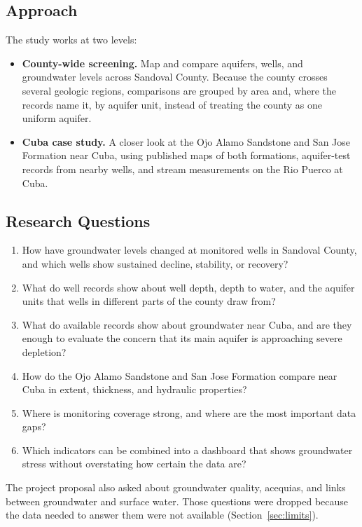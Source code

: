 \documentclass[10pt,twocolumn,letterpaper]{article}
\begin{document}
\subsection{Approach}
The study works at two levels:
\begin{itemize}
  \item \textbf{County-wide screening.} Map and compare aquifers, wells, and groundwater levels
        across Sandoval County. Because the county crosses several geologic regions, comparisons
        are grouped by area and, where the records name it, by aquifer unit, instead of treating
        the county as one uniform aquifer.
  \item \textbf{Cuba case study.} A closer look at the Ojo Alamo Sandstone and San Jose Formation
        near Cuba, using published maps of both formations, aquifer-test records from nearby
        wells, and stream measurements on the Rio Puerco at Cuba.
\end{itemize}

\subsection{Research Questions}
\begin{enumerate}[label={\color{titleblue}\bfseries RQ\arabic*.},leftmargin=2.6em,labelsep=0.4em]
  \item How have groundwater levels changed at monitored wells in Sandoval County, and which wells
        show sustained decline, stability, or recovery?
  \item What do well records show about well depth, depth to water, and the aquifer units that
        wells in different parts of the county draw from?
  \item What do available records show about groundwater near Cuba, and are they enough to
        evaluate the concern that its main aquifer is approaching severe depletion?
  \item How do the Ojo Alamo Sandstone and San Jose Formation compare near Cuba in extent,
        thickness, and hydraulic properties?
  \item Where is monitoring coverage strong, and where are the most important data gaps?
  \item Which indicators can be combined into a dashboard that shows groundwater stress without
        overstating how certain the data are?
\end{enumerate}
The project proposal also asked about groundwater quality, acequias, and links between
groundwater and surface water. Those questions were dropped because the data needed to answer
them were not available (Section~\ref{sec:limits}).
\end{document}
